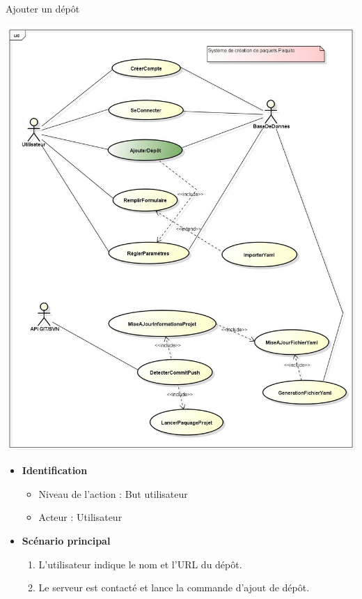 \documentclass[9pt,xcolor=dvipsnames]{beamer}
\begin{document}
\begin{frame}{Ajouter un dépôt}
  \begin{minipage}{0.40\textwidth}
    \begin{flushleft}
      \includegraphics[scale=\largeur]{../img/Diagram_ajouterDepot.jpg}
    \end{flushleft}
  \end{minipage}
  \hfill
  \begin{minipage}{0.5\textwidth}
    \begin{flushright}
      \begin{itemize} 
      \item \textbf{Identification} 
        \begin{itemize} 
        \item[] Niveau de l'action : But utilisateur 
        \item[] Acteur : Utilisateur 
        \end{itemize} 
      \item \textbf{Scénario principal} 
        \begin{enumerate} 
        \item L'utilisateur indique le nom et l'URL du dépôt. 
        \item Le serveur est contacté et lance la commande d'ajout de dépôt. 
        \end{enumerate} 
      \end{itemize}
    \end{flushright}
  \end{minipage}
\end{frame}
\end{document}
